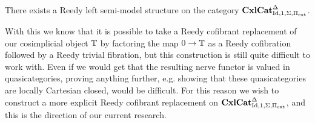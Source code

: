 \documentclass{amsart}
\begin{document}
\begin{cor}
    There exists a Reedy left semi-model structure on the category $\operatorname{\mathbf{CxlCat}}_{\operatorname{Id},1,\Sigma,\Pi_{\operatorname{ext}}}^\Delta$.
\end{cor}

With this we know that it is possible to take a Reedy cofibrant replacement of our cosimplicial object $\mathbb{T}$ by factoring the map $0\to\mathbb{T}$ as a Reedy cofibration followed by a Reedy trivial fibration, but this construction is still quite difficult to work with. Even if we would get that the resulting nerve functor is valued in quasicategories, proving anything further, e.g. showing that these quasicategories are locally Cartesian closed, would be difficult. For this reason we wish to construct a more explicit Reedy cofibrant replacement on $\operatorname{\mathbf{CxlCat}}_{\operatorname{Id},1,\Sigma,\Pi_{\operatorname{ext}}}^\Delta$, and this is the direction of our current research.


\newpage


\end{document}
